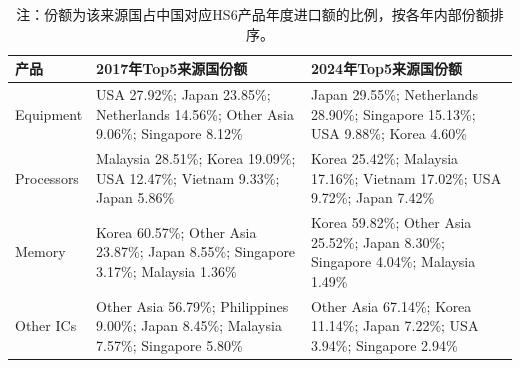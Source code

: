 \begin{table}[H]
\centering
\caption{2017与2024年主要来源国Top5对照}
\label{tab:source-top5-2017-2024}
\begin{tabular}{@{}>{\raggedright\arraybackslash}p{}>{\raggedright\arraybackslash}p{}>{\raggedright\arraybackslash}p{}@{}}
\toprule
产品 & 2017年Top5来源国份额 & 2024年Top5来源国份额 \\
\midrule
848620 Equipment & USA 27.92\%; Japan 23.85\%; Netherlands 14.56\%; Other Asia 9.06\%; Singapore 8.12\% & Japan 29.55\%; Netherlands 28.90\%; Singapore 15.13\%; USA 9.88\%; Korea 4.60\% \\
854231 Processors & Malaysia 28.51\%; Korea 19.09\%; USA 12.47\%; Vietnam 9.33\%; Japan 5.86\% & Korea 25.42\%; Malaysia 17.16\%; Vietnam 17.02\%; USA 9.72\%; Japan 7.42\% \\
854232 Memory & Korea 60.57\%; Other Asia 23.87\%; Japan 8.55\%; Singapore 3.17\%; Malaysia 1.36\% & Korea 59.82\%; Other Asia 25.52\%; Japan 8.30\%; Singapore 4.04\%; Malaysia 1.49\% \\
854239 Other ICs & Other Asia 56.79\%; Philippines 9.00\%; Japan 8.45\%; Malaysia 7.57\%; Singapore 5.80\% & Other Asia 67.14\%; Korea 11.14\%; Japan 7.22\%; USA 3.94\%; Singapore 2.94\% \\
\bottomrule
\end{tabular}
\caption*{注：份额为该来源国占中国对应HS6产品年度进口额的比例，按各年内部份额排序。}
\end{table}
